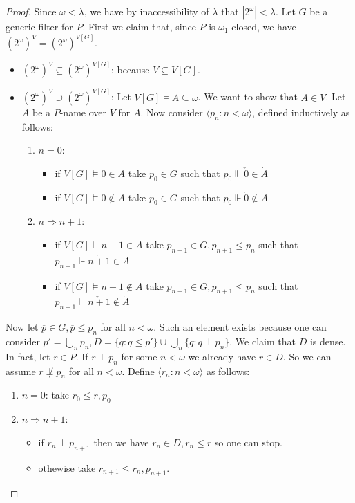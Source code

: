 \documentclass[a4paper,12pt]{article}
\theoremstyle{plain}
\theoremstyle{definition}
\theoremstyle{remark}
\begin{document}
\begin{proof}

	Since $\omega < \lambda$, we have by inaccessibility of $\lambda$ that $|2^{\omega}| < \lambda$.
	Let $G$ be a generic filter for $P$. First we claim that, since $P$ is $\omega_1$-closed, we have  $(2^{\omega})^V = (2^{\omega})^{V[G]}$.
	\begin{itemize}
		\item $(2^{\omega})^{V} \subseteq (2^{\omega})^{V[G]}$: because $V \subseteq V[G]$.
		\item $(2^{\omega})^{V} \supseteq (2^{\omega})^{V[G]}$: Let $V[G] \models A \subseteq \omega$.
			We want to show that $A \in V$. Let $\dot{A}$ be a $P$-name over $V$ for $A$.
			Now consider $\langle p_n : n < \omega \rangle$, defined inductively as follows:
			\begin{enumerate}

				\item $n = 0$:
					\begin{itemize}
						\item if $V[G] \models 0 \in A$ take $p_0 \in G$ such that $p_0 \Vdash \check{0} \in \dot{A}$
						\item if $V[G] \models 0 \not \in A$ take $p_0 \in G$ such that $p_0 \Vdash \check{0} \not \in \dot{A}$
					\end{itemize}

				\item $n \Rightarrow n+1$:
					\begin{itemize}
						\item if $V[G] \models n+1 \in A$ take $p_{n+1} \in G, p_{n+1} \leq p_n$ such that 
							$p_{n+1} \Vdash \check{n+1} \in \dot{A}$

						\item if $V[G] \models n+1 \not \in A$ take $p_{n+1} \in G, p_{n+1} \leq p_n$ such that 
							$p_{n+1} \Vdash \check{n+1} \not \in \dot{A}$


					\end{itemize}

			\end{enumerate}
	\end{itemize}
			Now let $\overline{p} \in G, \overline{p} \leq p_n$ for all $n<\omega$.
			Such an element exists because one can consider 
			$p' = \bigcup_{n} p_n, D = \{q : q \leq p'\} \cup \bigcup_{n} \{q: q \perp p_n\}$.
			We claim that $D$ is dense. In fact, let $r \in P$. If $r \perp p_n$ for some $n < \omega$ we already have $r \in D$.
			So we can assume $r \not \perp p_n$ for all $n < \omega$.
			Define $\langle r_n : n< \omega \rangle$ as follows:
			\begin{enumerate}
				\item $n=0$: take $r_0 \leq r,p_0$
				\item $n \Rightarrow n+1$: 
					\begin{itemize}
						\item if $r_n \perp p_{n+1}$ then we have $r_n \in D, r_n \leq r$ so one can stop. 
						\item othewise take $r_{n+1} \leq r_n, p_{n+1}$.
					\end{itemize}
			\end{enumerate}


\end{proof}
\end{document}
